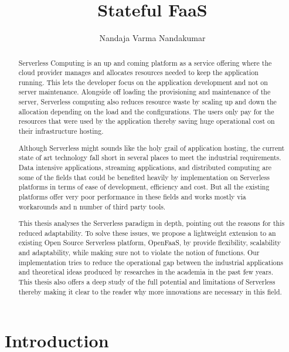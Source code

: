 \documentclass[12pt,titlepage]{article}
\author{Nandaja Varma Nandakumar}
\date{}
\title{Stateful FaaS}
\begin{document}
\maketitle
\begin{abstract}
Serverless Computing is an up and coming platform as a service offering 
where the cloud provider manages and allocates
resources needed to keep the application running. This lets the developer focus on the application development
and not on server maintenance. Alongside off loading the provisioning and
maintenance of the server, Serverless computing also reduces resource waste
by scaling up and down the allocation depending on the load and the
configurations. The users only pay for the resources that were used by the
application thereby saving huge operational cost on their infrastructure
hosting.

Although Serverless might sounds like the holy grail of application hosting, the 
current state of art technology fall short in several places to meet the industrial
requirements. Data intensive applications, streaming applications, and
distributed computing are some of the fields that could be benefited heavily by
implementation on Serverless platforms in terms of ease of development,
efficiency and cost. But all the existing platforms offer very
poor performance in these fields and works mostly via workarounds and n number
of third party tools.

This thesis analyses the Serverless paradigm in depth,
pointing out the reasons for this reduced adaptability. To solve these issues, we propose a lightweight
extension to an existing Open Source Serverless platform, OpenFaaS, by provide
flexibility, scalability and adaptability, while making sure not to violate the notion
of functions. Our implementation tries to reduce the operational gap between the
industrial applications and theoretical ideas produced by researches in the
academia in the past few years.
This thesis also offers a deep study of the full potential and limitations of
Serverless thereby making it clear to the reader why more innovations are
necessary in this field.

\end{abstract}

\setcounter{tocdepth}{4}
\tableofcontents


\section{Introduction}
\label{sec:org83bb847}
\end{document}
